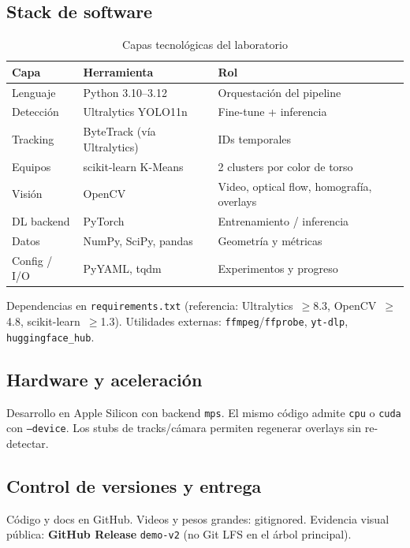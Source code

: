 \documentclass[11pt,a4paper]{article}
\begin{document}
\subsection{Stack de software}

\begin{table}[ht]
\centering
\caption{Capas tecnológicas del laboratorio}
\label{tab:stack}
\begin{tabular}{@{}llp{6.5cm}@{}}
\toprule
\textbf{Capa} & \textbf{Herramienta} & \textbf{Rol} \\
\midrule
Lenguaje & Python 3.10--3.12 & Orquestación del pipeline \\
Detección & Ultralytics YOLO11n & Fine-tune + inferencia \\
Tracking & ByteTrack (vía Ultralytics) & IDs temporales \\
Equipos & scikit-learn K-Means & 2 clusters por color de torso \\
Visión & OpenCV & Video, optical flow, homografía, overlays \\
DL backend & PyTorch & Entrenamiento / inferencia \\
Datos & NumPy, SciPy, pandas & Geometría y métricas \\
Config / I/O & PyYAML, tqdm & Experimentos y progreso \\
\bottomrule
\end{tabular}
\end{table}

Dependencias en \texttt{requirements.txt} (referencia: Ultralytics~$\geq$8.3, OpenCV~$\geq$4.8, scikit-learn~$\geq$1.3). Utilidades externas: \texttt{ffmpeg}/\texttt{ffprobe}, \texttt{yt-dlp}, \texttt{huggingface\_hub}.

\subsection{Hardware y aceleración}

Desarrollo en Apple Silicon con backend \texttt{mps}. El mismo código admite \texttt{cpu} o \texttt{cuda} con \texttt{--device}. Los stubs de tracks/cámara permiten regenerar overlays sin re-detectar.

\subsection{Control de versiones y entrega}

Código y docs en GitHub. Videos y pesos grandes: gitignored. Evidencia visual pública: \textbf{GitHub Release} \texttt{demo-v2} (no Git LFS en el árbol principal).
\end{document}
